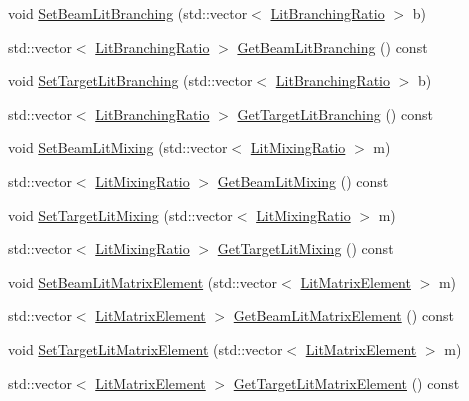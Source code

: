 \begin{DoxyCompactItemize}
void \hyperlink{classCoulExSimFitter_acfbdfe58274083ab962aa3ab1e29317f}{Set\-Beam\-Lit\-Branching} (std\-::vector$<$ \hyperlink{classLitBranchingRatio}{Lit\-Branching\-Ratio} $>$ b)
\item 
std\-::vector$<$ \hyperlink{classLitBranchingRatio}{Lit\-Branching\-Ratio} $>$ \hyperlink{classCoulExSimFitter_a45e7174fece6d9febbb881931247d009}{Get\-Beam\-Lit\-Branching} () const 
\item 
void \hyperlink{classCoulExSimFitter_aa8cbab1305bd8427eb0087841b42af07}{Set\-Target\-Lit\-Branching} (std\-::vector$<$ \hyperlink{classLitBranchingRatio}{Lit\-Branching\-Ratio} $>$ b)
\item 
std\-::vector$<$ \hyperlink{classLitBranchingRatio}{Lit\-Branching\-Ratio} $>$ \hyperlink{classCoulExSimFitter_a453dae7b194c1fb8d26b508719c7a6bf}{Get\-Target\-Lit\-Branching} () const 
\item 
void \hyperlink{classCoulExSimFitter_a704084e639512c8aa7c33dac939729b7}{Set\-Beam\-Lit\-Mixing} (std\-::vector$<$ \hyperlink{classLitMixingRatio}{Lit\-Mixing\-Ratio} $>$ m)
\item 
std\-::vector$<$ \hyperlink{classLitMixingRatio}{Lit\-Mixing\-Ratio} $>$ \hyperlink{classCoulExSimFitter_a819e4a179cced909c7947d25749df0c4}{Get\-Beam\-Lit\-Mixing} () const 
\item 
void \hyperlink{classCoulExSimFitter_a1a1b81c10927ccf088de83d53c60a97e}{Set\-Target\-Lit\-Mixing} (std\-::vector$<$ \hyperlink{classLitMixingRatio}{Lit\-Mixing\-Ratio} $>$ m)
\item 
std\-::vector$<$ \hyperlink{classLitMixingRatio}{Lit\-Mixing\-Ratio} $>$ \hyperlink{classCoulExSimFitter_af28a9a7e25758f41f1e766df60626cea}{Get\-Target\-Lit\-Mixing} () const 
\item 
void \hyperlink{classCoulExSimFitter_a3bed31a509b214f95eed7c950fc3662e}{Set\-Beam\-Lit\-Matrix\-Element} (std\-::vector$<$ \hyperlink{classLitMatrixElement}{Lit\-Matrix\-Element} $>$ m)
\item 
std\-::vector$<$ \hyperlink{classLitMatrixElement}{Lit\-Matrix\-Element} $>$ \hyperlink{classCoulExSimFitter_a369711d2a1b020b1c13e1be01177a3ab}{Get\-Beam\-Lit\-Matrix\-Element} () const 
\item 
void \hyperlink{classCoulExSimFitter_ae50d3433daddf20c1b1e54c28a6e5924}{Set\-Target\-Lit\-Matrix\-Element} (std\-::vector$<$ \hyperlink{classLitMatrixElement}{Lit\-Matrix\-Element} $>$ m)
\item 
std\-::vector$<$ \hyperlink{classLitMatrixElement}{Lit\-Matrix\-Element} $>$ \hyperlink{classCoulExSimFitter_af06ba87876b55b5d87820b84311a3a38}{Get\-Target\-Lit\-Matrix\-Element} () const 

\end{DoxyCompactItemize}

